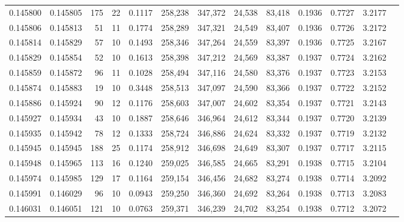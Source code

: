 \begin{tabular}{rrrrrrrrrrrrr}
0.145800 & 0.145805 &   175 &  22 &                                     0.1117 & 258,238 & 347,372 &  24,538 &  83,418 & 0.1936 & 0.7727 & 3.2177 \\
0.145806 & 0.145813 &    51 &  11 &                                     0.1774 & 258,289 & 347,321 &  24,549 &  83,407 & 0.1936 & 0.7726 & 3.2172 \\
0.145814 & 0.145829 &    57 &  10 &                                     0.1493 & 258,346 & 347,264 &  24,559 &  83,397 & 0.1936 & 0.7725 & 3.2167 \\
0.145829 & 0.145854 &    52 &  10 &                                     0.1613 & 258,398 & 347,212 &  24,569 &  83,387 & 0.1937 & 0.7724 & 3.2162 \\
0.145859 & 0.145872 &    96 &  11 &                                     0.1028 & 258,494 & 347,116 &  24,580 &  83,376 & 0.1937 & 0.7723 & 3.2153 \\
0.145874 & 0.145883 &    19 &  10 &                                     0.3448 & 258,513 & 347,097 &  24,590 &  83,366 & 0.1937 & 0.7722 & 3.2152 \\
0.145886 & 0.145924 &    90 &  12 &                                     0.1176 & 258,603 & 347,007 &  24,602 &  83,354 & 0.1937 & 0.7721 & 3.2143 \\
0.145927 & 0.145934 &    43 &  10 &                                     0.1887 & 258,646 & 346,964 &  24,612 &  83,344 & 0.1937 & 0.7720 & 3.2139 \\
0.145935 & 0.145942 &    78 &  12 &                                     0.1333 & 258,724 & 346,886 &  24,624 &  83,332 & 0.1937 & 0.7719 & 3.2132 \\
0.145945 & 0.145945 &   188 &  25 &                                     0.1174 & 258,912 & 346,698 &  24,649 &  83,307 & 0.1937 & 0.7717 & 3.2115 \\
0.145948 & 0.145965 &   113 &  16 &                                     0.1240 & 259,025 & 346,585 &  24,665 &  83,291 & 0.1938 & 0.7715 & 3.2104 \\
0.145974 & 0.145985 &   129 &  17 &                                     0.1164 & 259,154 & 346,456 &  24,682 &  83,274 & 0.1938 & 0.7714 & 3.2092 \\
0.145991 & 0.146029 &    96 &  10 &                                     0.0943 & 259,250 & 346,360 &  24,692 &  83,264 & 0.1938 & 0.7713 & 3.2083 \\
0.146031 & 0.146051 &   121 &  10 &                                     0.0763 & 259,371 & 346,239 &  24,702 &  83,254 & 0.1938 & 0.7712 & 3.2072 \\

\end{tabular}
